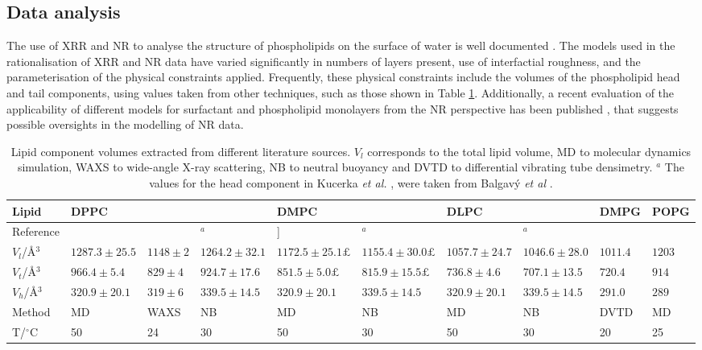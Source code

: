 \documentclass[amsmath,amssymb,twocolumn,superscriptaddress]{revtex4-1}
\begin{document}
\subsection{Data analysis}
%
The use of XRR and NR to analyse the structure of phospholipids on the surface of water is well documented \cite{Mohwald1990,Kewalramani2010,Bayerl1990,Johnson1991,Clifton2012,Helm1987,Daillant1990}.
The models used in the rationalisation of XRR and NR data have varied significantly in numbers of layers present, use of interfactial roughness, and the parameterisation of the physical constraints applied.
Frequently, these physical constraints include the volumes of the phospholipid head and tail components, using values taken from other techniques, such as those shown in Table \ref{tab:water}.
Additionally, a recent evaluation of the applicability of different models for surfactant and phospholipid monolayers from the NR perspective has been published \cite{Campbell2018}, that suggests possible oversights in the modelling of NR data.
%
\begin{table}
	\caption{\label{tab:water} Lipid component volumes extracted from different literature sources.
  $V_l$ corresponds to the total lipid volume, MD to molecular dynamics simulation, WAXS to wide-angle X-ray scattering, NB to neutral buoyancy and DVTD to differential vibrating tube densimetry. $^a$
  The values for the head component in Kucerka \emph{et al.} \cite{Kucerka2004}, were taken from Balgav\'{y} \emph{et al} \cite{Balgavy2001}.}
  \begin{ruledtabular}
	\begin{tabular*}{\textwidth}{l|lll|ll|ll|l|l}
    Lipid & DPPC & & & DMPC & & DLPC & & DMPG & POPG \\
    \hline
    Reference & \cite{Armen1998} & \cite{Sun1994} &
    \cite{Kucerka2004,Balgavy2001}$^a$ & \cite{Armen1998}] & \cite{Kucerka2004,Balgavy2001}$^a$ & \cite{Armen1998} & \cite{Kucerka2004,Balgavy2001}$^a$ & \cite{Pan2012} &
    \cite{Kucerka2012} \\
    \hline
    $V_l$/\AA$^3$ & $1287.3\pm25.5$ & $1148\pm2$ & $1264.2\pm32.1$ &
    $1172.5\pm25.1£$ & $1155.4\pm30.0£$ & $1057.7\pm24.7$ & $1046.6\pm28.0$ &
    $1011.4$ & $1203$ \\
    $V_t$/\AA$^3$ & $966.4\pm5.4$ & $829\pm4$ & $924.7\pm17.6$ &
    $851.5\pm5.0£$ & $815.9\pm15.5£$ & $736.8\pm4.6$ & $707.1\pm13.5$ &
    $720.4$ & $914$ \\
    $V_h$/\AA$^3$ & $320.9\pm20.1$ & $319\pm6$ & $339.5\pm14.5$ &
    $320.9\pm20.1$ & $339.5\pm14.5$ & $320.9\pm20.1$ & $339.5\pm14.5$ &
    $291.0$ & $289$ \\
    Method & MD & WAXS & NB & MD & NB & MD & NB & DVTD & MD \\
    T/$^\circ$C & 50 & 24 & 30 & 50 & 30 & 50 & 30 & 20 & 25 \\
	\end{tabular*}
  \end{ruledtabular}
\end{table}
%
\end{document}

